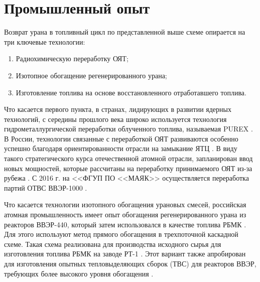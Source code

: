 \section{Промышленный опыт}\label{sec:ch1/sec1}

Возврат урана в топливный цикл по представленной выше схеме опирается на три ключевые технологии:
\begin{enumerate}
  \item Радиохимическую переработку ОЯТ;
  \item Изотопное обогащение регенерированного урана;
  \item Изготовление топлива на основе восстановленного отработавшего топлива.
\end{enumerate}

Что касается первого пункта, в странах, лидирующих в развитии ядерных технологий, с середины прошлого века широко используется технология гидрометаллургической переработки облученного топлива, называемая PUREX \cite{selvaduraySurveyNuclearFuel1979}. В России, технологии связанные с переработкой ОЯТ развиваются особенно успешно благодаря ориентированности отрасли на замыкание ЯТЦ \cite{balihinSostoyaniiPerspektivahRazvitiya2018, efimenkoProblemyPerspektivyRazvitiya2017}. В виду такого стратегического курса отечественной атомной отрасли, запланирован ввод новых мощностей, которые рассчитаны на переработку принимаемого ОЯТ из-за рубежа \cite{050519L3942005}. С 2016 г. на <<ФГУП ПО <<МАЯК>> осуществляется переработка партий ОТВС ВВЭР-1000 \cite{PyatyyNacionalnyyDoklad}.

Что касается технологии изотопного обогащения урановых смесей, российская атомная промышленность имеет опыт обогащения регенерированного урана из реакторов ВВЭР-440, который затем использовался в качестве топлива РБМК \cite{VVER10001200Za}. Для этого используют метод прямого обогащения в трехпоточной каскадной схеме. Такая схема реализована для производства исходного сырья для изготовления топлива РБМК на заводе РТ-1 \cite{volkVozvratUranaIz2010}. Этот вариант также апробирован для изготовления опытных тепловыделяющих сборок (ТВС) для реакторов ВВЭР, требующих более высокого уровня обогащения \cite{proselkovAnalizVozmozhnostiIspolzovaniya2003}.

